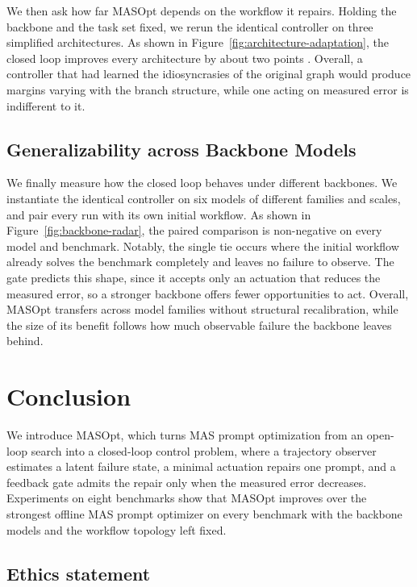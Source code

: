\documentclass{article}
\theoremstyle{definition}
\begin{document}
We then ask how far MASOpt depends on the workflow it repairs. Holding the backbone and the task set fixed, we rerun the identical controller on three simplified architectures. As shown in Figure~\ref{fig:architecture-adaptation}, the closed loop improves every architecture by about two points \citep{zhang2024aflow}. Overall, a controller that had learned the idiosyncrasies of the original graph would produce margins varying with the branch structure, while one acting on measured error is indifferent to it.

\subsection{Generalizability across Backbone Models}
\label{sec:backbone-adaptation}

We finally measure how the closed loop behaves under different backbones. We instantiate the identical controller on six models of different families and scales, and pair every run with its own initial workflow. As shown in Figure~\ref{fig:backbone-radar}, the paired comparison is non-negative on every model and benchmark. Notably, the single tie occurs where the initial workflow already solves the benchmark completely and leaves no failure to observe. The gate predicts this shape, since it accepts only an actuation that reduces the measured error, so a stronger backbone offers fewer opportunities to act. Overall, MASOpt transfers across model families without structural recalibration, while the size of its benefit follows how much observable failure the backbone leaves behind.

\section{Conclusion}
\label{sec:conclusion}

We introduce MASOpt, which turns MAS prompt optimization from an open-loop search into a closed-loop control problem, where a trajectory observer estimates a latent failure state, a minimal actuation repairs one prompt, and a feedback gate admits the repair only when the measured error decreases. Experiments on eight benchmarks show that MASOpt improves over the strongest offline MAS prompt optimizer on every benchmark with the backbone models and the workflow topology left fixed.

\subsection*{Ethics statement}
\end{document}
